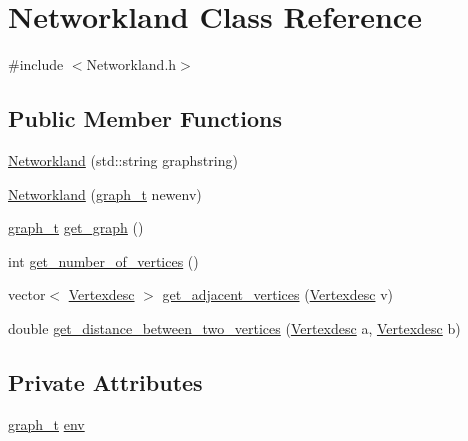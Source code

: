 \hypertarget{classNetworkland}{}\section{Networkland Class Reference}
\label{classNetworkland}


{\ttfamily \#include $<$Networkland.\+h$>$}

\subsection*{Public Member Functions}
\begin{DoxyCompactItemize}
\item 
\hyperlink{classNetworkland_ad9660d7325a66ec575f4f062d7b8a68e}{Networkland} (std\+::string graphstring)
\item 
\hyperlink{classNetworkland_a10c1fd4b0c8855453099235fd2b94248}{Networkland} (\hyperlink{Networkland_8h_a15c13903d8f520e4339ca612a1ee2652}{graph\+\_\+t} newenv)
\item 
\hyperlink{Networkland_8h_a15c13903d8f520e4339ca612a1ee2652}{graph\+\_\+t} \hyperlink{classNetworkland_a603e68baf499b857ed7e6c0194d97116}{get\+\_\+graph} ()
\item 
int \hyperlink{classNetworkland_aee6ec50ecb1defd9d46d78268031d389}{get\+\_\+number\+\_\+of\+\_\+vertices} ()
\item 
vector$<$ \hyperlink{Networkland_8h_af340ced64bd0b6914662d1b26be70b41}{Vertexdesc} $>$ \hyperlink{classNetworkland_a5cf7695e7ebab3132599be3df75b59f1}{get\+\_\+adjacent\+\_\+vertices} (\hyperlink{Networkland_8h_af340ced64bd0b6914662d1b26be70b41}{Vertexdesc} v)
\item 
double \hyperlink{classNetworkland_a8bd3817fe681bf6516bcbb5766f0c389}{get\+\_\+distance\+\_\+between\+\_\+two\+\_\+vertices} (\hyperlink{Networkland_8h_af340ced64bd0b6914662d1b26be70b41}{Vertexdesc} a, \hyperlink{Networkland_8h_af340ced64bd0b6914662d1b26be70b41}{Vertexdesc} b)
\end{DoxyCompactItemize}
\subsection*{Private Attributes}
\begin{DoxyCompactItemize}
\item 
\hyperlink{Networkland_8h_a15c13903d8f520e4339ca612a1ee2652}{graph\+\_\+t} \hyperlink{classNetworkland_abea776c7ff7c40e160371b260967e2c7}{env}
\end{DoxyCompactItemize}


